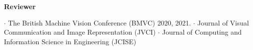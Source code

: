 


\vspace{-.5em}
\textbf{Reviewer}
\begin{cvskills}
\cvskill
{} %
{\hspace{-3em} \textbf{$\cdot$} The British Machine Vision Conference (BMVC) 2020, 2021.}
\cvskill
{} %
{\hspace{-3em} \textbf{$\cdot$} Journal of Visual Communication and Image Representation (JVCI)}
\cvskill
{}
{\hspace{-3em} \textbf{$\cdot$} Journal of Computing and Information Science in Engineering (JCISE)}


\end{cvskills}
